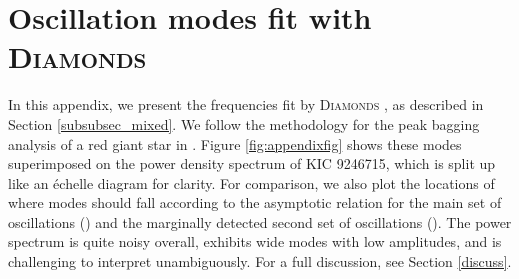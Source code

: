 \appendix
\section{Oscillation modes fit with \textsc{D\large{iamonds}}}
\label{appendix}

In this appendix, we present the frequencies fit by \textsc{D\large{iamonds}} \citep{cor14}, as described in Section \ref{subsubsec_mixed}. We follow the methodology for the peak bagging analysis of a red giant star in \citet{cor15}. Figure \ref{fig:appendixfig} shows these modes superimposed on the power density spectrum of KIC 9246715, which is split up like an \'echelle diagram for clarity. For comparison, we also plot the locations of where modes should fall according to the asymptotic relation \citep{mos12} for the main set of oscillations () and the marginally detected second set of oscillations (). The power spectrum is quite noisy overall, exhibits wide modes with low amplitudes, and is challenging to interpret unambiguously. For a full discussion, see Section \ref{discuss}.